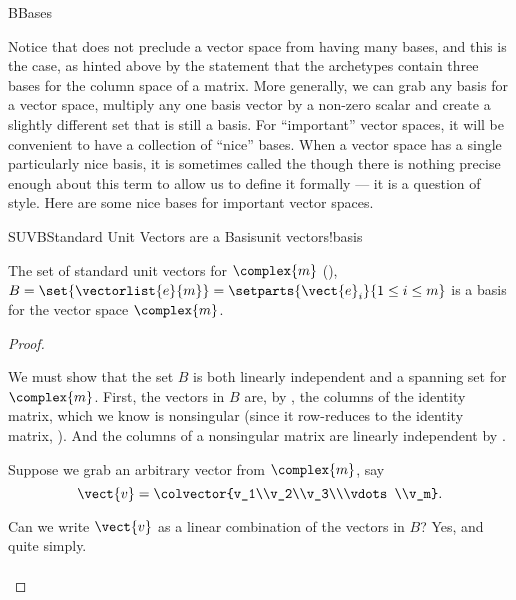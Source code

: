 \begin{subsect}{B}{Bases}
%
\begin{para}Notice that  does not preclude a vector space from having many bases, and this is the case, as hinted above by the statement that the archetypes contain three bases for the column space of a matrix.  More generally, we can grab any basis for a vector space, multiply any one basis vector by a non-zero scalar and create a slightly different set that is still a basis.  For ``important'' vector spaces, it will be convenient to have a collection of ``nice'' bases.  When a vector space has a single particularly nice basis, it is sometimes called the  though there is nothing precise enough about this term to allow us to define it formally --- it is a question of style.  Here are some nice bases for important vector spaces.\end{para}
%
\begin{theorem}{SUVB}{Standard Unit Vectors are a Basis}{unit vectors!basis}
\begin{para}The set of standard unit vectors for $\complex{m}$ (), $B=\set{\vectorlist{e}{m}}=\setparts{\vect{e}_i}{1\leq i\leq m}$ is a basis for the vector space $\complex{m}$.\end{para}
\end{theorem}
%
\begin{proof}
\begin{para}We must show that the set $B$ is both linearly independent and a spanning set for
$\complex{m}$.  First, the vectors in $B$ are, by , the columns of the identity matrix, which we know is nonsingular (since it row-reduces to the identity matrix, ).  And the columns of a nonsingular matrix are linearly independent by .\end{para}
%
\begin{para}Suppose we grab an arbitrary vector from $\complex{m}$, say
%
\begin{equation*}
\vect{v}=\colvector{v_1\\v_2\\v_3\\\vdots\\v_m}.
\end{equation*}
\end{para}
%
\begin{para}Can we write $\vect{v}$ as a linear combination of the vectors in $B$?  Yes, and quite simply.
%
\begin{align*}

\end{align*}
\end{para}
\end{proof}
\end{subsect}
